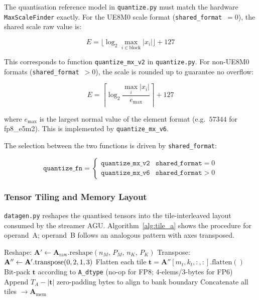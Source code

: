 The quantisation reference model in \texttt{quantize.py} must match the
hardware \texttt{MaxScaleFinder} exactly.  For the UE8M0 scale format
(\texttt{shared\_format}~$= 0$), the shared scale raw value is:

\begin{equation}
E = \lfloor \log_2 \max_{i \in \text{block}} |x_i| \rfloor + 127
\label{eq:scale_hw}
\end{equation}

This corresponds to function \texttt{quantize\_mx\_v2} in
\texttt{quantize.py}.  For non-UE8M0 formats (\texttt{shared\_format}~$> 0$),
the scale is rounded up to guarantee no overflow:

\begin{equation}
E = \left\lceil \log_2 \frac{\max_i |x_i|}{e_{\max}} \right\rceil + 127
\label{eq:scale_v6}
\end{equation}

where $e_{\max}$ is the largest normal value of the element format
(e.g.\ $57344$ for fp8\_e5m2).  This is implemented by
\texttt{quantize\_mx\_v6}.

The selection between the two functions is driven by \texttt{shared\_format}:

\begin{equation}
\texttt{quantize\_fn} =
\begin{cases}
  \texttt{quantize\_mx\_v2} & \texttt{shared\_format} = 0 \\
  \texttt{quantize\_mx\_v6} & \texttt{shared\_format} > 0
\end{cases}
\label{eq:quant_select}
\end{equation}

\subsubsection{Tensor Tiling and Memory Layout}
\label{sec:integration:sw:tiling}

\texttt{datagen.py} reshapes the quantised tensors into the
tile-interleaved layout consumed by the streamer AGU.
Algorithm~\ref{alg:tile_a} shows the procedure for operand~A; operand~B
follows an analogous pattern with axes transposed.

\begin{algorithm}[h]
\caption{Tile reordering for operand A}
\label{alg:tile_a}
\DontPrintSemicolon
{}
\BlankLine
Reshape: $\mathbf{A}' \leftarrow
  \mathbf{A}_{\mathrm{raw}}.\mathrm{reshape}(n_M,\, P_M,\, n_K,\, P_K)$ \;
Transpose: $\mathbf{A}'' \leftarrow \mathbf{A}'.{\rm transpose}(0, 2, 1, 3)$
Flatten each tile $\mathbf{t} = \mathbf{A}''[m_t, k_t, :, :].\mathrm{flatten}()$ \;
Bit-pack $\mathbf{t}$ according to \texttt{A\_dtype} (no-op for FP8;
  4-elems/3-bytes for FP6) \;
Append $T_A - |\mathbf{t}|$ zero-padding bytes to align to bank boundary \;
Concatenate all tiles $\rightarrow \mathbf{A}_{\mathrm{mem}}$
\end{algorithm}


